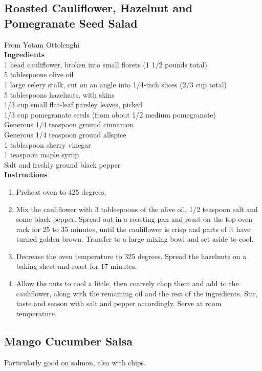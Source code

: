 \documentclass{article}
\numberwithin{figure}{section}
\numberwithin{equation}{section}
\begin{document}
\pagebreak
\subsection{Roasted Cauliflower, Hazelnut and Pomegranate Seed Salad}
From Yotam Ottolenghi\\

{\bf Ingredients}\\
1 head cauliflower, broken into small florets (1 1/2 pounds total)\\
5 tablespoons olive oil\\
1 large celery stalk, cut on an angle into 1/4-inch slices (2/3 cup total)\\
5 tablespoons hazelnuts, with skins\\
1/3 cup small flat-leaf parsley leaves, picked\\
1/3 cup pomegranate seeds (from about 1/2 medium pomegranate)\\
Generous 1/4 teaspoon ground cinnamon\\
Generous 1/4 teaspoon ground allspice\\
1 tablespoon sherry vinegar\\
1 teaspoon maple syrup\\
Salt and freshly ground black pepper\\

{\bf Instructions}
\begin{enumerate}
\item Preheat oven to 425 degrees.
\item Mix the cauliflower with 3 tablespoons of the olive oil, 1/2 teaspoon salt and some black pepper. Spread out in a roasting pan and roast on the top oven rack for 25 to 35 minutes, until the cauliflower is crisp and parts of it have turned golden brown. Transfer to a large mixing bowl and set aside to cool.
\item Decrease the oven temperature to 325 degrees. Spread the hazelnuts on a baking sheet and roast for 17 minutes.
\item Allow the nuts to cool a little, then coarsely chop them and add to the cauliflower, along with the remaining oil and the rest of the ingredients. Stir, taste and season with salt and pepper accordingly. Serve at room temperature.
\end{enumerate}




\pagebreak
\subsection{Mango Cucumber Salsa}
Particularly good on salmon, also with chips.\\
\end{document}
